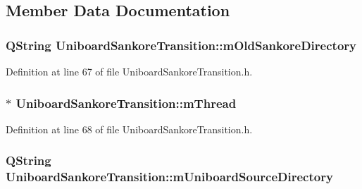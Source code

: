 \subsection{Member Data Documentation}
\hypertarget{class_uniboard_sankore_transition_a996150102eb052a27b3b317c8e4813d8}{
\subsubsection[{m\-Old\-Sankore\-Directory}]{\setlength{\rightskip}{0pt plus 5cm}Q\-String Uniboard\-Sankore\-Transition\-::m\-Old\-Sankore\-Directory\hspace{0.3cm}{\ttfamily [protected]}}}\label{df/d64/class_uniboard_sankore_transition_a996150102eb052a27b3b317c8e4813d8}


Definition at line 67 of file Uniboard\-Sankore\-Transition.\-h.

\hypertarget{class_uniboard_sankore_transition_ae14a529d4d0ed7a98ef1d3f442b37d18}{
\subsubsection[{m\-Thread}]{$\ast$ Uniboard\-Sankore\-Transition\-::m\-Thread\hspace{0.3cm}{\ttfamily [protected]}}}\label{df/d64/class_uniboard_sankore_transition_ae14a529d4d0ed7a98ef1d3f442b37d18}


Definition at line 68 of file Uniboard\-Sankore\-Transition.\-h.

\hypertarget{class_uniboard_sankore_transition_a1d345315b23aecd23f91196c14071457}{
\subsubsection[{m\-Uniboard\-Source\-Directory}]{\setlength{\rightskip}{0pt plus 5cm}Q\-String Uniboard\-Sankore\-Transition\-::m\-Uniboard\-Source\-Directory\hspace{0.3cm}{\ttfamily [protected]}}}\label{df/d64/class_uniboard_sankore_transition_a1d345315b23aecd23f91196c14071457}


